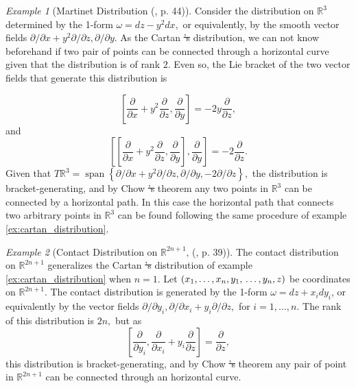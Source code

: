 \documentclass[12pt, letterpaper, reqno]{amsart}
\theoremstyle{definition}
\theoremstyle{plain}
\theoremstyle{remark}
\newtheorem{ex}{Example}
\providecommand{\DIFdel}[1]{{\protect\color{red}\sout{#1}}}                      %
\providecommand{\DIFdelbegin}{} %
\providecommand{\DIFdelend}{} %
\newcommand{\DIFscaledelfig}{0.5}
\newlength{\DIFdelgraphicswidth} %
\newlength{\DIFdelgraphicsheight} %
\newcommand{\DIFdelincludegraphics}[2][]{%
\sbox{\DIFdelgraphicsbox}{\DIFOincludegraphics[#1]{#2}}%
\settoboxwidth{\DIFdelgraphicswidth}{\DIFdelgraphicsbox} %
\settoboxtotalheight{\DIFdelgraphicsheight}{\DIFdelgraphicsbox} %
\scalebox{\DIFscaledelfig}{%
\parbox[b]{\DIFdelgraphicswidth}{\usebox{\DIFdelgraphicsbox}\\[-\baselineskip] \rule{\DIFdelgraphicswidth}{0em}}\llap{\resizebox{\DIFdelgraphicswidth}{\DIFdelgraphicsheight}{%
\setlength{\unitlength}{\DIFdelgraphicswidth}%
\begin{picture}(1,1)%
\thicklines\linethickness{2pt} %
{\color[rgb]{1,0,0}\put(0,0){\framebox(1,1){}}}%
{\color[rgb]{1,0,0}\put(0,0){\line( 1,1){1}}}%
{\color[rgb]{1,0,0}\put(0,1){\line(1,-1){1}}}%
\end{picture}%
}\hspace*{3pt}}} %
} %
\DeclareRobustCommand{\DIFdelbegin}{\DIFOdelbegin \let\includegraphics\DIFdelincludegraphics} %
\DeclareRobustCommand{\DIFdelend}{\DIFOaddend \let\includegraphics\DIFOincludegraphics} %
\begin{document}
\begin{ex}[Martinet Distribution (\cite{montgomery2002tour}, p. 44)]
	Consider the distribution on $ \mathbb{R}^3 $ determined by the 1-form $ \omega = dz-y^2dx, $ or equivalently, by the smooth vector fields $ \partial/\partial x+y^2\partial/\partial z, \partial/\partial y $. As the Cartan \DIFdelbegin \DIFdel{'s }\DIFdelend distribution, we can not know beforehand if two pair of points can be connected through a horizontal curve given that the distribution is of rank $ 2. $ Even so, the Lie bracket of the two vector fields that generate this distribution is  

	$$ \left[ \frac{\partial }{\partial x} + y^2 \frac{\partial }{\partial z} , \frac{\partial }{\partial y}  \right] =-2y \frac{\partial }{\partial z}, $$ 
	and 
	$$ \left[\left[ \frac{\partial }{\partial x} + y^2 \frac{\partial }{\partial z} , \frac{\partial }{\partial y}  \right], \frac{\partial }{\partial y} \right] = -2 \frac{\partial }{\partial z}.  $$ 
	Given that $ T \mathbb{R}^3 = \operatorname{span} \left\{ \partial/\partial x+ y^2\partial/\partial z, \partial/\partial y, -2\partial/\partial z \right\},  $ the distribution is bracket-generating, and by Chow \DIFdelbegin \DIFdel{'s }\DIFdelend theorem any two points in $ \mathbb{R}^3 $ can be connected by a horizontal path. In this case the horizontal path that connects two arbitrary points in $ \mathbb{R}^3 $ can be found following the same procedure of example \ref{ex:cartan_distribution}.
\end{ex}

\begin{ex}[Contact Distribution on $ \mathbb{R}^{2n+1} $, (\cite{montgomery2002tour}, p. 39)]
	The contact distribution on $ \mathbb{R}^{2n+1} $ generalizes the Cartan \DIFdelbegin \DIFdel{'s }\DIFdelend distribution of example \ref{ex:cartan_distribution} when $ n=1 $. Let $ (x_1,\dots,x_n,y_1,\\\dots, y_n,z) $ be coordinates on $ \mathbb{R}^{2n+1} $. The contact distribution is generated by the 1-form $ \omega = dz+ x_i dy_i$, or equivalently by the vector fields $ \partial/ \partial y_i, \partial/ \partial x_i+ y_i \partial/\partial z, $ for $ i=1,\dots, n. $ The rank of this distribution is $ 2n, $ but as 
	$$ \left[ \frac{\partial }{\partial y_i} , \frac{\partial }{\partial x_i} + y_i \frac{\partial }{\partial z}  \right] = \frac{\partial }{\partial z},  $$ 
	this distribution is bracket-generating, and by Chow \DIFdelbegin \DIFdel{'s }\DIFdelend theorem any pair of point in $ \mathbb{R}^{2n+1} $ can be connected through an horizontal curve.
\end{ex}
\end{document}

